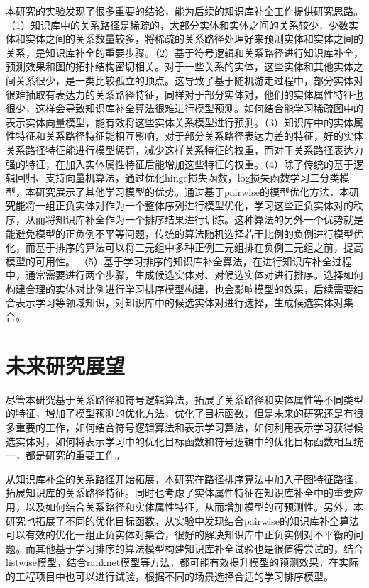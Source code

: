 本研究的实验发现了很多重要的结论，能为后续的知识库补全工作提供研究思路。（1）知识库中的关系路径是稀疏的，大部分实体和实体之间的关系较少，少数实体和实体之间的关系数量较多，将稀疏的关系路径处理好来预测实体和实体之间的关系，是知识库补全的重要步骤。（2）基于符号逻辑和关系路径进行知识库补全，预测效果和图的拓扑结构密切相关。对于一些关系的实体，这些实体和其他实体之间关系很少，是一类比较孤立的顶点。这导致了基于随机游走过程中，部分实体对很难抽取有表达力的关系路径特征，同样对于部分实体对，他们的实体属性特征也很少，这样会导致知识库补全算法很难进行模型预测。如何结合能学习稀疏图中的表示实体向量模型，能有效将这些实体关系模型进行预测。（3）知识库中的实体属性特征和关系路径特征能相互影响，对于部分关系路径表达力差的特征，好的实体关系路径特征能进行模型惩罚，减少这样关系特征的权重，而对于关系路径表达力强的特征，在加入实体属性特征后能增加这些特征的权重。（4）除了传统的基于逻辑回归、支持向量机算法，通过优化hinge损失函数，log损失函数学习二分类模型，本研究展示了其他学习模型的优势。通过基于pairwise的模型优化方法，本研究能将一组正负实体对作为一个整体序列进行模型优化，学习这些正负实体对的秩序，从而将知识库补全作为一个排序结果进行训练。这种算法的另外一个优势就是能避免模型的正负例不平等问题，传统的算法随机选择若干比例的负例进行模型优化，而基于排序的算法可以将三元组中多种正例三元组排在负例三元组之前，提高模型的可用性。
（5）基于学习排序的知识库补全算法，在进行知识库补全过程中，通常需要进行两个步骤，生成候选实体对、对候选实体对进行排序。选择如何构建合理的实体对比例进行学习排序模型构建，也会影响模型的效果，后续需要结合表示学习等领域知识，对知识库中的候选实体对进行选择，生成候选实体对集合。

\section{未来研究展望}
尽管本研究基于关系路径和符号逻辑算法，拓展了关系路径和实体属性等不同类型的特征，增加了模型预测的优化方法，优化了目标函数，但是未来的研究还是有很多重要的工作，如何结合符号逻辑算法和表示学习算法，如何利用表示学习获得候选实体对，如何将表示学习中的优化目标函数和符号逻辑中的优化目标函数相互统一，都是研究的重要工作。

从知识库补全的关系路径开始拓展，本研究在路径排序算法中加入子图特征路径，拓展知识库的关系路径特征。同时也考虑了实体属性特征在知识库补全中的重要应用，以及如何结合关系路径和实体属性特征，从而增加模型的可预测性。另外，本研究也拓展了不同的优化目标函数，从实验中发现结合pairwise的知识库补全算法可以有效的优化一组正负实体对集合，很好的解决知识库中正负实例对不平衡的问题。而其他基于学习排序的算法模型构建知识库补全试验也是很值得尝试的，结合listwise模型，结合ranknet模型等方法，都可能有效提升模型的预测效果，在实际的工程项目中也可以进行试验，根据不同的场景选择合适的学习排序模型。

